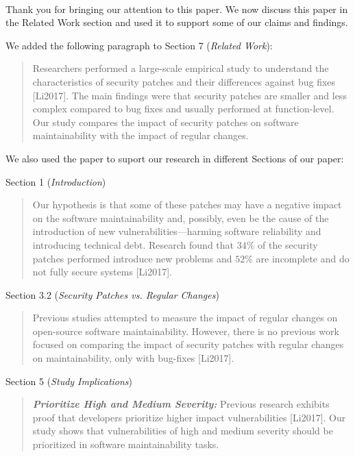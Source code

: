 \documentclass[11pt,fleqn]{article}
\newcommand{\eline}{\vspace*{.75\baselineskip}}
\newcommand{\Us}{\eline \noindent {\bf Response:}\\}
\begin{document}
\Us Thank you for bringing our attention to this paper. We now discuss
this paper in the Related Work section and used it to support some 
of our claims and findings. 

We added the following paragraph to Section 7 (\emph{Related Work}):

\begin{quote}
    Researchers
performed a large-scale empirical study to understand the characteristics of security patches
and their differences against bug fixes [Li2017].
The main findings were that security patches are smaller and less complex compared
to bug fixes and usually performed at function-level. Our study compares
the impact of security patches on software maintainability with the impact 
of regular changes.
\end{quote}

We also used the paper to suport our research in different Sections of our paper: 

Section 1 (\emph{Introduction})
\begin{quote}
    Our hypothesis is that some of these patches may 
have a negative impact on the software maintainability and, 
possibly, even be the cause of the introduction of new 
vulnerabilities---harming software reliability and introducing 
technical debt. Research found that $34\%$ of the security patches 
performed introduce new problems and $52\%$ are incomplete and do not 
fully secure systems [Li2017].
\end{quote}

Section 3.2 (\emph{Security Patches vs. Regular Changes})
\begin{quote}
    Previous studies attempted to measure the impact of regular changes 
on open-source software maintainability. 
However, there is no previous work focused on comparing the impact 
of security patches with regular changes on maintainability, only
with bug-fixes [Li2017].
\end{quote}

Section 5 (\emph{Study Implications})
\begin{quote}
    \textit{\textbf{Prioritize High and Medium Severity:}} Previous research 
exhibits proof that developers prioritize
higher impact vulnerabilities [Li2017].
Our study shows that vulnerabilities of high and
medium severity should be prioritized in software maintainability tasks.
\end{quote}
\end{document}
